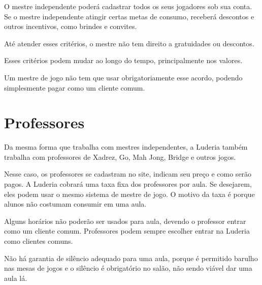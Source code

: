 O mestre independente poderá cadastrar todos os seus jogadores sob sua conta. Se o mestre independente atingir certas metas de consumo, receberá descontos e outros incentivos, como brindes e convites.

Até atender esses critérios, o mestre não tem direito a gratuidades ou descontos.

Esses critérios podem mudar ao longo do tempo, principalmente nos valores. 

Um mestre de jogo não tem que usar obrigatoriamente  esse acordo, podendo simplesmente pagar como um cliente comum. 




\section{Professores}

Da mesma forma que trabalha com mestres independentes, a Luderia também trabalha com professores de Xadrez, Go, Mah Jong, Bridge e outros jogos. 

Nesse caso, os professores se cadastram no site, indicam seu preço e como serão pagos. A Luderia cobrará uma taxa fixa dos professores por aula. Se desejarem, eles podem usar o mesmo sistema de mestre de jogo. O motivo da taxa é porque alunos não costumam consumir em uma aula.

Alguns horários não poderão ser usados para aula, devendo o professor entrar como um cliente comum.
Professores podem sempre escolher entrar na Luderia como clientes comuns.

Não há garantia de silêncio adequado para uma aula, porque é permitido barulho nas mesas de jogos e o silêncio é obrigatório no salão, não sendo viável dar uma aula lá.

